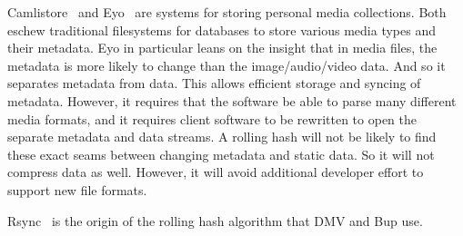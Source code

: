 Camlistore~\cite{camlistore_homepage} and Eyo~\cite{Strauss:2011:EDP:2002181.2002216} are systems for storing personal media collections.
Both eschew traditional filesystems for databases to store various media types and their metadata.
Eyo in particular leans on the insight that in media files, the metadata is more likely to change than the image/audio/video data.
And so it separates metadata from data.
This allows efficient storage and syncing of metadata.
However, it requires that the software be able to parse many different media formats, and it requires client software to be rewritten to open the separate metadata and data streams.
A rolling hash will not be likely to find these exact seams between changing metadata and static data.
So it will not compress data as well.
However, it will avoid additional developer effort to support new file formats.

Rsync~\cite{rsynctechreport} is the origin of the rolling hash algorithm that DMV and Bup use.

